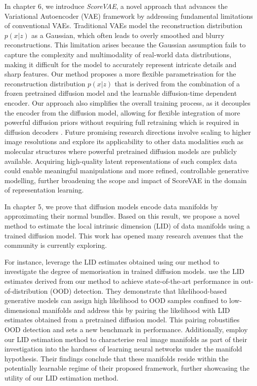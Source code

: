 In chapter 6, we introduce \emph{ScoreVAE}, a novel approach that advances the Variational Autoencoder (VAE) framework by addressing fundamental limitations of conventional VAEs. Traditional VAEs model the reconstruction distribution $p(x|z)$ as a Gaussian, which often leads to overly smoothed and blurry reconstructions. This limitation arises because the Gaussian assumption fails to capture the complexity and multimodality of real-world data distributions, making it difficult for the model to accurately represent intricate details and sharp features. Our method proposes a more flexible parametrisation for the reconstruction distribution $p(x|z)$ that is derived from the combination of a frozen pretrained diffusion model and the learnable diffusion-time dependent encoder. Our approach also simplifies the overall training process, as it decouples the encoder from the diffusion model, allowing for flexible integration of more powerful diffusion priors without requiring full retraining which is required in diffusion decoders \cite{preechakul2022diffusion_decoder}. Future promising research directions involve scaling to higher image resolutions and explore its applicability to other data modalities such as molecular structures where powerful pretrained diffusion models are publicly available. Acquiring high-quality latent representations of such complex data could enable meaningful manipulations and more refined, controllable generative modelling, further broadening the scope and impact of ScoreVAE in the domain of representation learning.

In chapter 5, we prove that diffusion models encode data manifolds by approximating their normal bundles. Based on this result, we propose a novel method to estimate the local intrinsic dimension (LID) of data manifolds using a trained diffusion model. This work has opened many research avenues that the community is currently exploring.

For instance, \citet{achilli2024losing} leverage the LID estimates obtained using our method to investigate the degree of memorisation in trained diffusion models. \citet{kamkari2024geometric} use the LID estimates derived from our method to achieve state-of-the-art performance in out-of-distribution (OOD) detection. They demonstrate that likelihood-based generative models can assign high likelihood to OOD samples confined to low-dimensional manifolds and address this by pairing the likelihood with LID estimates obtained from a pretrained diffusion model. This pairing robustifies OOD detection and sets a new benchmark in performance. Additionally, \citet{kiani2024hardness} employ our LID estimation method to characterise real image manifolds as part of their investigation into the hardness of learning neural networks under the manifold hypothesis. Their findings conclude that these manifolds reside within the potentially learnable regime of their proposed framework, further showcasing the utility of our LID estimation method.

